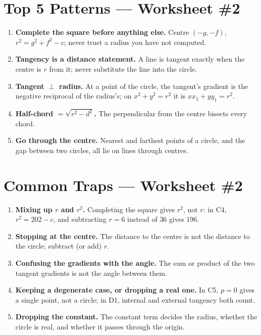 \documentclass[11pt,a4paper]{article}
\begin{document}
\section*{Top 5 Patterns --- Worksheet \#2}
\begin{enumerate}[leftmargin=2em, itemsep=4pt]
  \item \textbf{Complete the square before anything else.} Centre $(-g,-f)$, $r^2=g^2+f^2-c$; never trust a radius you have not computed. 
  \item \textbf{Tangency is a distance statement.} A line is tangent exactly when the centre is $r$ from it; never substitute the line into the circle. 
  \item \textbf{Tangent $\perp$ radius.} At a point of the circle, the tangent's gradient is the negative reciprocal of the radius's; on $x^2+y^2=r^2$ it is $xx_1+yy_1=r^2$. 
  \item \textbf{Half-chord $=\sqrt{r^2-d^2}$.} The perpendicular from the centre bisects every chord. 
  \item \textbf{Go through the centre.} Nearest and farthest points of a circle, and the gap between two circles, all lie on lines through centres. 
\end{enumerate}

\section*{Common Traps --- Worksheet \#2}
\begin{enumerate}[leftmargin=2em, itemsep=4pt]
  \item \textbf{Mixing up $r$ and $r^2$.} Completing the square gives $r^2$, not $r$: in C4, $r^2=202-c$, and subtracting $r=6$ instead of $36$ gives $196$. 
  \item \textbf{Stopping at the centre.} The distance to the centre is not the distance to the circle; subtract (or add) $r$. 
  \item \textbf{Confusing the gradients with the angle.} The sum or product of the two tangent gradients is not the angle between them. 
  \item \textbf{Keeping a degenerate case, or dropping a real one.} In C5, $p=0$ gives a single point, not a circle; in D1, internal and external tangency both count. 
  \item \textbf{Dropping the constant.} The constant term decides the radius, whether the circle is real, and whether it passes through the origin. 
\end{enumerate}

\end{document}
